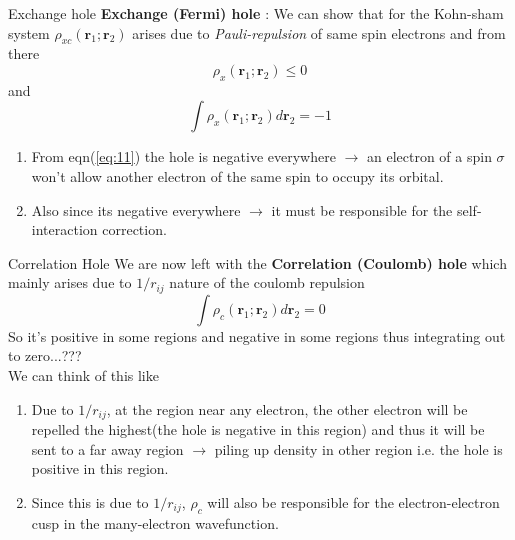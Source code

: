 \documentclass{beamer}
\begin{document}
	\begin{frame}[t]{Exchange hole}
	\textbf{Exchange (Fermi) hole} : We can show that for the Kohn-sham system $\rho_{xc}(\textbf{r}_1;\textbf{r}_2)$ arises due to \textit{Pauli-repulsion} of same spin electrons and from there 
	\begin{equation}\label{eq:11}
	\rho_{x}(\textbf{r}_1;\textbf{r}_2) \leqslant 0
	\end{equation}
	and
	\begin{equation}\label{eq:12}
	\displaystyle{\int} \rho_{x}(\textbf{r}_1;\textbf{r}_2) d\textbf{r}_2 = -1
	\end{equation}\pause
	\begin{enumerate}
	\item{From eqn(\ref{eq:11}) the hole is negative everywhere $\rightarrow$ an electron of a spin $\sigma$ won't allow another electron of the same spin to occupy its orbital.}\pause
	\item{Also since its negative everywhere $\rightarrow$ it must be responsible for the self-interaction correction.}
	\end{enumerate}
	\end{frame}
	
	\begin{frame}[t]{Correlation Hole}
	We are now left with the \textbf{Correlation (Coulomb) hole} which mainly arises due to $1/r_{ij}$ nature of the coulomb repulsion
	\begin{equation}\label{eq:13}
	\displaystyle{\int} \rho_{c}(\textbf{r}_1;\textbf{r}_2) d\textbf{r}_2 = 0
	\end{equation}
	So  it's positive in some regions and negative in some regions thus integrating out to zero...???\pause \\We can think of this like\pause
	\begin{enumerate}
	\item{Due to $1/r_{ij}$, at the region near any electron, the other electron will be repelled the highest(the hole is negative in this region) and thus it will be sent to a far away region $\rightarrow$ piling up density in other region i.e. the hole is positive in this region.}\pause
	\item{Since this is due to $1/r_{ij}$, $\rho_c$ will also be responsible for the electron-electron cusp in the many-electron wavefunction.}
	\end{enumerate}
	\end{frame}
	
\end{document}
